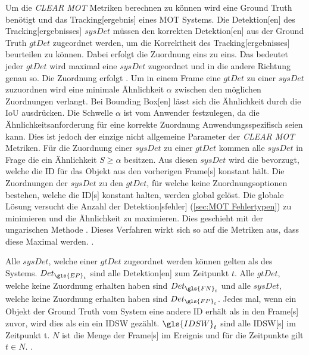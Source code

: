 Um die \textit{\acrshort{CLEAR} \gls{MOT}} Metriken berechnen zu können wird eine \gls{Ground Truth} benötigt und das \gls{Tracking}[ergebnis] eines \gls{MOT} Systems. Die \gls{Detektion}[en] des \gls{Tracking}[ergebnisses] \(sysDet\) müssen den korrekten \gls{Detektion}[en] aus der \gls{Ground Truth} \(gtDet\) zugeordnet werden, um die Korrektheit des \gls{Tracking}[ergebnisses] beurteilen zu können. Dabei erfolgt die Zuordnung eins zu eins. Das bedeutet jeder \(gtDet\) wird maximal eine \(sysDet\) zugeordnet und in die andere Richtung genau so. Die Zuordnung erfolgt . Um in einem \gls{Frame} eine \(gtDet\) zu einer \(sysDet\) zuzuordnen wird eine minimale Ähnlichkeit \(\alpha\) zwischen den möglichen Zuordnungen verlangt. Bei \gls{Bounding Box}[en] lässt sich die Ähnlichkeit durch die \gls{IoU} ausdrücken. Die Schwelle \(\alpha\) ist vom Anwender festzulegen, da die Ähnlichkeitsanforderung für eine korrekte Zuordnung Anwendungsspezifisch seien kann. Dies ist jedoch der einzige nicht allgemeine Parameter der \textit{\acrshort{CLEAR} \gls{MOT}} Metriken. Für die Zuordnung einer \(sysDet\) zu einer \(gtDet\) kommen alle \(sysDet\) in Frage die ein Ähnlichkeit \(S \geq \alpha\) besitzen. Aus diesen \(sysDet\) wird die bevorzugt, welche die \acrshort{ID} für das Objekt aus den vorherigen \gls{Frame}[s] konstant hält. Die Zuordnungen der \(sysDet\) zu den  \(gtDet\), für welche keine Zuordnungsoptionen bestehen, welche die \acrshort{ID}[s] konstant halten, werden global gelöst. Die globale Lösung versucht die Anzahl der \gls{Detektion}[sfehler] (\ref{sec:MOT Fehlertypen}) zu minimieren und die Ähnlichkeit zu maximieren. Dies geschieht mit der ungarischen Methode \cite{Kuhn.1955}. Dieses Verfahren wirkt sich so auf die Metriken aus, dass diese Maximal werden. \cite{CLEAR.2008, HOTA}. \par

Alle \(sysDet\), welche einer \(gtDet\) zugeordnet werden können gelten als  des Systems. \(Det_{\gls{EP}_t}\) sind alle  \gls{Detektion}[en] zum Zeitpunkt \(t\). Alle \(gtDet\), welche keine Zuordnung erhalten haben sind  \(Det_{\gls{FN}_t}\) und alle \(sysDet\), welche keine Zuordnung erhalten haben sind  \(Det_{\gls{FP}_t}\). Jedes mal, wenn ein Objekt der \gls{Ground Truth} vom System eine andere \acrshort{ID} erhält als in den \gls{Frame}[s] zuvor, wird dies als ein ein \gls{IDSW} gezählt. \(\gls{IDSW}_t\) sind alle \gls{IDSW}[s] im Zeitpunkt t. \(N\) ist die Menge der \gls{Frame}[s] im \gls{Ereignis} und für die Zeitpunkte gilt \(t \in N\). \cite{CLEAR.2008, IDF1}. \par

